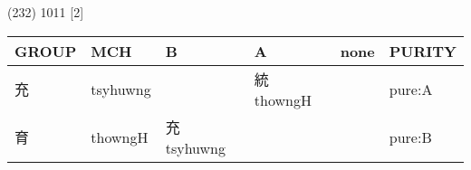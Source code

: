 \documentclass[14pt,a4paper]{scrartcl}
\begin{document}
(232) 1011 {[}2{]}

\begin{longtable}[c]{@{}llllll@{}}
\toprule
\begin{minipage}[b]{0.14\columnwidth}\raggedright\strut
GROUP
\strut\end{minipage} &
\begin{minipage}[b]{0.14\columnwidth}\raggedright\strut
MCH
\strut\end{minipage} &
\begin{minipage}[b]{0.14\columnwidth}\raggedright\strut
B
\strut\end{minipage} &
\begin{minipage}[b]{0.14\columnwidth}\raggedright\strut
A
\strut\end{minipage} &
\begin{minipage}[b]{0.14\columnwidth}\raggedright\strut
none
\strut\end{minipage} &
\begin{minipage}[b]{0.14\columnwidth}\raggedright\strut
PURITY
\strut\end{minipage}\tabularnewline
\midrule
\endhead
\begin{minipage}[t]{0.14\columnwidth}\raggedright\strut
充
\strut\end{minipage} &
\begin{minipage}[t]{0.14\columnwidth}\raggedright\strut
tsyhuwng
\strut\end{minipage} &
\begin{minipage}[t]{0.14\columnwidth}\raggedright\strut
\strut\end{minipage} &
\begin{minipage}[t]{0.14\columnwidth}\raggedright\strut
統 thowngH
\strut\end{minipage} &
\begin{minipage}[t]{0.14\columnwidth}\raggedright\strut
\strut\end{minipage} &
\begin{minipage}[t]{0.14\columnwidth}\raggedright\strut
pure:A
\strut\end{minipage}\tabularnewline
\begin{minipage}[t]{0.14\columnwidth}\raggedright\strut
育
\strut\end{minipage} &
\begin{minipage}[t]{0.14\columnwidth}\raggedright\strut
thowngH
\strut\end{minipage} &
\begin{minipage}[t]{0.14\columnwidth}\raggedright\strut
充 tsyhuwng
\strut\end{minipage} &
\begin{minipage}[t]{0.14\columnwidth}\raggedright\strut
\strut\end{minipage} &
\begin{minipage}[t]{0.14\columnwidth}\raggedright\strut
\strut\end{minipage} &
\begin{minipage}[t]{0.14\columnwidth}\raggedright\strut
pure:B
\strut\end{minipage}\tabularnewline
\bottomrule
\end{longtable}
\end{document}
